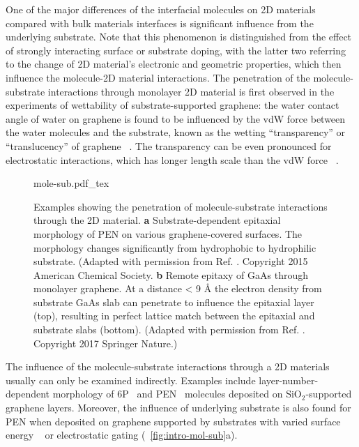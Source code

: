 One of the major differences of the interfacial molecules on 2D
materials compared with bulk materials interfaces is significant
influence from the underlying substrate. Note that this phenomenon is
distinguished from the effect of strongly interacting surface or
substrate doping, with the latter two referring to the change of 2D
material's electronic and geometric properties, which then influence
the molecule-2D material interactions. The penetration of the
molecule-substrate interactions through monolayer 2D material is first
observed in the experiments of wettability of substrate-supported
graphene: the water contact angle of water on graphene is found to be
influenced by the vdW force between the water molecules and the
substrate, known as the wetting ``transparency'' or ``translucency''
of graphene
~\cite{rafiee_wetting_2012,Shih_2012_prl,shih_wetting_2013}. The
transparency can be even pronounced for electrostatic interactions,
which has longer length scale than the vdW force
~\cite{Shih_2015_PartiallyScreened,Tian_2016_multiscale}.
\begin{figure}[h]
  \centering
  {mole-sub.pdf_tex}
  \caption{\label{fig:intro-mol-sub}%
    Examples showing the penetration of molecule-substrate
    interactions through the 2D material. \textbf{a}
    Substrate-dependent epitaxial morphology of PEN on various
    graphene-covered surfaces. The morphology changes significantly
    from hydrophobic to hydrophilic substrate. (Adapted with
    permission from Ref. \cite{Nguyen_2015_pent_gr_wett}. Copyright 2015
    American Chemical Society. \textbf{b} Remote epitaxy of GaAs
    through monolayer graphene. At a distance < 9 Å the electron
    density from substrate GaAs slab can penetrate to influence the
    epitaxial layer (top), resulting in perfect lattice match between
    the epitaxial and substrate slabs (bottom).  (Adapted with
    permission from Ref. \cite{Kim_2017_remote_epi_Gr}. Copyright 2017
    Springer Nature.)%
  }
\end{figure}
The
influence of the molecule-substrate interactions through a 2D
materials usually can only be examined indirectly.
%
Examples include layer-number-dependent morphology of
6P~\cite{Kratzer_2014_6P_gr_layer} and
PEN~\cite{Chhikara_2014_gr_pent_trans} molecules deposited on
SiO\(_{\text{2}}\)-supported graphene layers. Moreover, the influence
of underlying substrate is also found for PEN when deposited on
graphene supported by substrates with varied surface energy
~\cite{Nguyen_2015_pent_gr_wett} or electrostatic gating
\cite{Nguyen_2019_PEN} (~\autoref{fig:intro-mol-sub}a).
